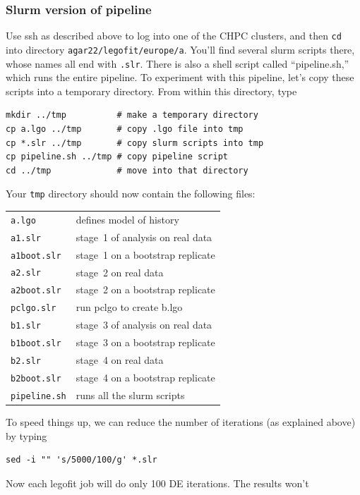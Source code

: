\documentclass[11pt]{article}
\begin{document}
\subsubsection{Slurm version of pipeline}
\label{sec.slurmpipe}
Use ssh as described above to log into one of the CHPC clusters, and
then \texttt{cd} into directory
\texttt{agar22/legofit/europe/a}. You'll find several slurm scripts
there, whose names all end with \texttt{.slr}. There is also a shell
script called ``pipeline.sh,'' which runs the entire pipeline.  To
experiment with this pipeline, let's copy these scripts into a
temporary directory. From within this directory, type
\begin{verbatim}
mkdir ../tmp          # make a temporary directory
cp a.lgo ../tmp       # copy .lgo file into tmp
cp *.slr ../tmp       # copy slurm scripts into tmp
cp pipeline.sh ../tmp # copy pipeline script
cd ../tmp             # move into that directory
\end{verbatim}
Your \texttt{tmp} directory should now contain the following files:
\begin{center}
  \begin{tabular}{ll}
\texttt{a.lgo} & defines model of history\\    
\texttt{a1.slr} & stage~1 of analysis on real data\\
\texttt{a1boot.slr} & stage~1 on a bootstrap replicate\\
\texttt{a2.slr} & stage~2 on real data\\
\texttt{a2boot.slr} & stage~2 on a bootstrap replicate\\
\texttt{pclgo.slr} & run pclgo to create b.lgo  \\
\texttt{b1.slr} & stage~3 of analysis on real data\\
\texttt{b1boot.slr} & stage~3 on a bootstrap replicate\\
\texttt{b2.slr} & stage~4 on real data\\
\texttt{b2boot.slr} & stage~4 on a bootstrap replicate\\
\verb|pipeline.sh| & runs all the slurm scripts\\
\end{tabular}
\end{center}
To speed things up, we can reduce the number of iterations (as
explained above) by typing
\begin{verbatim}
sed -i "" 's/5000/100/g' *.slr 
\end{verbatim}
Now each legofit job will do only 100 DE iterations. The results won't
\end{document}
